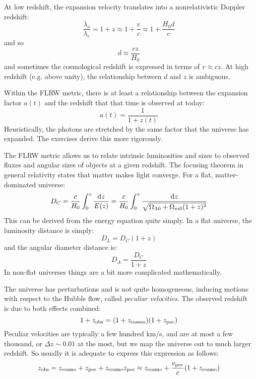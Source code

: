 At low redshift, the expansion velocity translates into a
nonrelativistic Doppler redshift:
\begin{equation} 
\frac{\lambda_o}{\lambda_e} = 1+z  \approx 1 + \frac{v}{c} \approx 1
+ \frac{H_0 d}{c}
\end{equation} 
and so
\begin{equation}
d \approx \frac{cz}{H_0}
\end{equation}
and sometimes the cosmological redshift is expressed in terms of
$v\approx cz$. At high redshift (e.g. above unity), the relationship
between $d$ and $z$ is ambiguous. 

Within the FLRW metric, there is at least a relationship between the
expansion factor $a(t)$ and the redshift that that time is observed at
today:
\begin{equation}
a(t) = \frac{1}{1+z(t)}
\end{equation}
Heuristically, the photons are stretched by the same factor that the
universe has expanded. The exercises derive this more rigorously. 

The FLRW metric allows us to relate intrinsic luminosities and sizes
to observed fluxes and angular sizes of objects at a given
redshift. The focusing theorem in general relativity states that
matter makes light converge. For a flat, matter-dominated universe:
\begin{equation}
D_C= 
\frac{c}{H_0} \int_0^z \frac{{\rm d}z}{E(z)}
= 
\frac{c}{H_0} \int_0^z \frac{{\rm d}z}{\sqrt{\Omega_{\Lambda0} +
    \Omega_{m0}(1+z)^3}}
\end{equation}
This can be derived from the energy equation quite simply. In a flat
universe, the luminosity distance is simply:
\begin{equation}
D_L = D_C (1+z)
\end{equation}
and the angular diameter distance is:
\begin{equation}
D_A = \frac{D_C}{1+z}
\end{equation}
In non-flat universes things are a bit more complicated
mathematically.

The universe has perturbations and is not quite homogeneous, inducing
motions with respect to the Hubble flow, called {\it peculiar
velocities}.  The observed redshift is due to both effects combined:
\begin{equation}
1+z_{\rm obs} = (1+z_{\rm cosmo})(1+z_{\rm pec})
\end{equation}
Peculiar velocities are typically a few hundred km/s, and are at most
a few thousand, or $\Delta z \sim 0.01$ at the most, but we map the
universe out to much larger redshift. So usually it is adequate to
express this expression as follows:
\begin{equation}
z_{\rm obs} = z_{\rm cosmo}+z_{\rm pec} + z_{\rm cosmo}z_{\rm pec}
\approx z_{\rm cosmo} + \frac{v_{\rm pec}}{c} (1+z_{\rm cosmo})
\end{equation}


